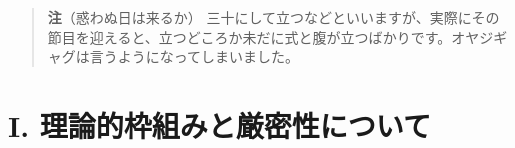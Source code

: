 \documentclass[a4paper,12pt,openany]{book}
\begin{document}
\begin{quote}
\textbf{注}（惑わぬ日は来るか）
三十にして立つなどといいますが、実際にその節目を迎えると、立つどころか未だに式と腹が立つばかりです。オヤジギャグは言うようになってしまいました。
\end{quote}

\par\vspace{0.35em}\par

\hypertarget{i.-ux7406ux8ad6ux7684ux67a0ux7d44ux307fux3068ux53b3ux5bc6ux6027ux306bux3064ux3044ux3066}{%
\section{I.
理論的枠組みと厳密性について}\label{i.-ux7406ux8ad6ux7684ux67a0ux7d44ux307fux3068ux53b3ux5bc6ux6027ux306bux3064ux3044ux3066}}
\end{document}
